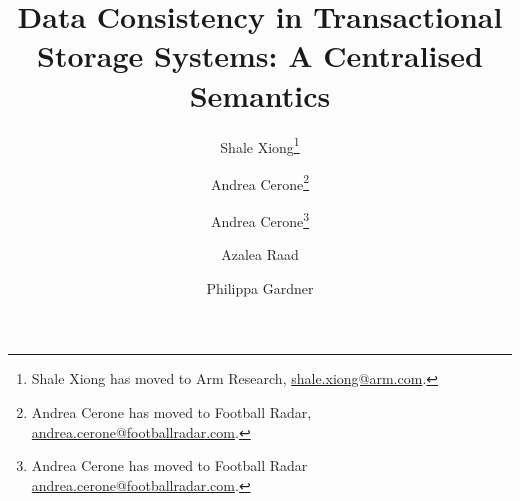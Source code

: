 \documentclass[a4paper,UKenglish,cleveref,autoref,thm-restate]{lipics-v2019}
\title{Data Consistency in Transactional Storage Systems: A Centralised Semantics}
\author{Shale Xiong\footnote{Shale Xiong has moved to Arm Research, \url{shale.xiong@arm.com}.}}
       {Department of Computing, Imperial College London, UK}{shale.xiong14@ic.ac.uk}
       {}
\author{Andrea Cerone\footnote{Andrea Cerone has moved to Football Radar, \url{andrea.cerone@footballradar.com}.}}
       {Department of Computing, Imperial College London, UK}
       {andrea.cerone@fic.ac.uk}
       {}
       {EPSRC Programme Grant REMS: Rigorous Engineering for Mainstream Systems (EP/K008528/1)}
\author{Andrea Cerone\footnote{Andrea Cerone has moved to Football Radar \url{andrea.cerone@footballradar.com}.}}
       {Department of Computing, Imperial College London, UK}
       {andrea.cerone@fic.ac.uk}
       {}
       {EPSRC Programme Grant `REMS: Rigorous Engineering for Mainstream Systems' (EP/K008528/1)}
\author{Azalea Raad}
       {MPI-SWS, Germany}
       {azalea@mpi-sws.org}
       {}
       {ERC Horizon 2020 Consolidator Grant `RustBelt' (grant agreement no.\ 683289)}
\author{Philippa Gardner}
       {Department of Computing, Imperial College London, UK}
       {p.gardner@ic.ac.uk}
       {}
\newcommand{\RootPath}{.}
\begin{document}
\maketitle

\begin{abstract}

\end{abstract}








\end{document}
